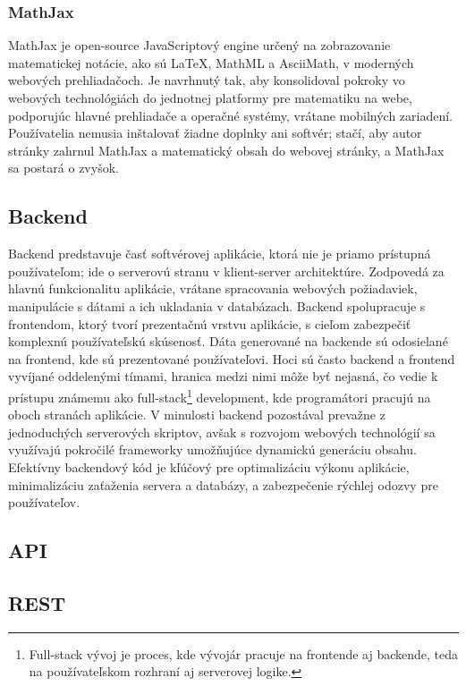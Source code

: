 \subsubsection{MathJax}
MathJax \cite{MathJax} je open-source JavaScriptový engine určený na zobrazovanie matematickej notácie, ako sú LaTeX, MathML a AsciiMath, v moderných webových prehliadačoch.
Je navrhnutý tak, aby konsolidoval pokroky vo webových technológiách do jednotnej platformy pre matematiku na webe, podporujúc hlavné prehliadače a operačné systémy, vrátane mobilných zariadení.
Používatelia nemusia inštalovať žiadne doplnky ani softvér; stačí, aby autor stránky zahrnul MathJax a matematický obsah do webovej stránky, a MathJax sa postará o zvyšok.



\subsection{Backend}
Backend predstavuje časť softvérovej aplikácie, ktorá nie je priamo prístupná používateľom; ide o serverovú stranu v klient-server architektúre.
 Zodpovedá za hlavnú funkcionalitu aplikácie, vrátane spracovania webových požiadaviek, manipulácie s dátami a ich ukladania v databázach. Backend spolupracuje s frontendom, ktorý tvorí prezentačnú vrstvu aplikácie, s cieľom zabezpečiť komplexnú používateľskú skúsenosť. 
 Dáta generované na backende sú odosielané na frontend, kde sú prezentované používateľovi.
  Hoci sú často backend a frontend vyvíjané oddelenými tímami, hranica medzi nimi môže byť nejasná, čo vedie k prístupu známemu ako full-stack\footnote{Full-stack vývoj je proces, kde vývojár pracuje na frontende aj backende, teda na používateľskom rozhraní aj serverovej logike.} development, kde programátori pracujú na oboch stranách aplikácie.
   V minulosti backend pozostával prevažne z jednoduchých serverových skriptov, avšak s rozvojom webových technológií sa využívajú pokročilé frameworky umožňujúce dynamickú generáciu obsahu.
 Efektívny backendový kód je kľúčový pre optimalizáciu výkonu aplikácie, minimalizáciu zaťaženia servera a databázy, a zabezpečenie rýchlej odozvy pre používateľov. \cite{backend} 
 \subsection{API}
 \subsection{REST}
